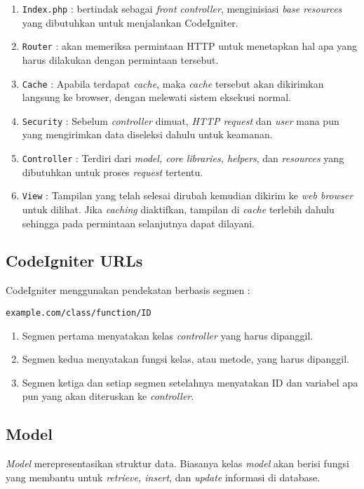 \begin{enumerate}
\item \texttt{Index.php} : bertindak sebagai \textit{front controller}, menginisiasi \textit{base resources} yang dibutuhkan untuk menjalankan CodeIgniter.
\item \texttt{Router} : akan memeriksa permintaan HTTP untuk menetapkan hal apa yang harus dilakukan dengan permintaan tersebut.
\item \texttt{Cache} : Apabila terdapat \textit{cache}, maka \textit{cache} tersebut akan dikirimkan langsung ke browser, dengan melewati sistem eksekusi normal.
\item \texttt{Security} : Sebelum \textit{controller} dimuat, \textit{HTTP request} dan \textit{user} mana pun yang mengirimkan data diseleksi dahulu untuk keamanan.
\item \texttt{Controller} : Terdiri dari \textit{model, core libraries, helpers}, dan \textit{resources} yang dibutuhkan untuk proses \textit{request} tertentu.
\item \texttt{View} : Tampilan yang telah selesai dirubah kemudian dikirim ke \textit{web browser} untuk dilihat. Jika \textit{caching} diaktifkan, tampilan di \textit{cache} terlebih dahulu sehingga pada permintaan selanjutnya dapat dilayani.\cite{codeigniter}
\end{enumerate}

\subsection{CodeIgniter URLs}
\label{subs:urls}
CodeIgniter menggunakan pendekatan berbasis segmen :
\begin{lstlisting}[frame=single] 
example.com/class/function/ID
\end{lstlisting}

\begin{enumerate}
\item Segmen pertama menyatakan kelas \textit{controller} yang harus dipanggil.
\item Segmen kedua menyatakan fungsi kelas, atau metode, yang harus dipanggil.
\item Segmen ketiga dan setiap segmen setelahnya menyatakan ID dan variabel apa pun yang akan diteruskan ke \textit{controller}.
\end{enumerate}

\subsection{Model}
\label{subs:model}
\textit{Model} merepresentasikan struktur data. Biasanya kelas \textit {model} akan berisi fungsi yang membantu untuk \textit{retrieve, insert}, dan \textit{update} informasi di database.

